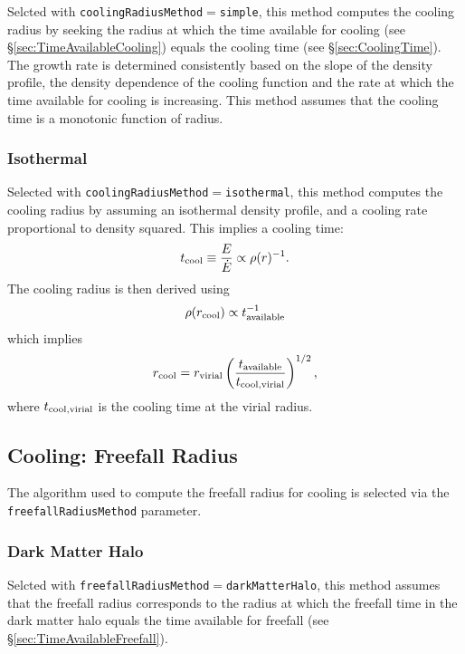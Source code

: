 Selcted with {\tt coolingRadiusMethod}$=${\tt simple}, this method computes the cooling radius by seeking the radius at which the time available for cooling (see \S\ref{sec:TimeAvailableCooling}) equals the cooling time (see \S\ref{sec:CoolingTime}). The growth rate is determined consistently based on the slope of the density profile, the density dependence of the cooling function and the rate at which the time available for cooling is increasing. This method assumes that the cooling time is a monotonic function of radius.

\subsubsection{Isothermal}

Selected with {\tt coolingRadiusMethod}$=${\tt isothermal}, this method computes the cooling radius by assuming an isothermal density profile, and a cooling rate proportional to density squared. This implies a cooling time:
\begin{equation}
 t_{\rm cool} \equiv {E\over\dot{E}} \propto \rho(r)^{-1}.
\end{equation}
The cooling radius is then derived using
\begin{equation}
 \rho(r_{\rm cool}) \propto t_{\rm available}^{-1}
\end{equation}
which implies
\begin{equation}
 r_{\rm cool} = r_{\rm virial} \left( { t_{\rm available} \over t_{\rm cool,virial}} \right)^{1/2},
\end{equation}
where $t_{\rm cool,virial}$ is the cooling time at the virial radius.

\subsection{Cooling: Freefall Radius}\label{sec:CoolingFreefallRadius}

The algorithm used to compute the freefall radius for cooling is selected via the {\tt freefallRadiusMethod} parameter.

\subsubsection{Dark Matter Halo}

Selcted with {\tt freefallRadiusMethod}$=${\tt darkMatterHalo}, this method assumes that the freefall radius corresponds to the radius at which the freefall time in the dark matter halo equals the time available for freefall (see \S\ref{sec:TimeAvailableFreefall}).

